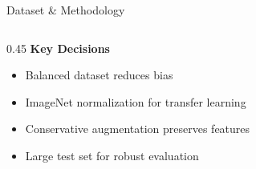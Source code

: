 \documentclass[aspectratio=169]{beamer}
\begin{document}
\begin{frame}{Dataset \& Methodology}
\begin{columns}[T]
\begin{column}{0.45\textwidth}
            \vspace{0.3cm}
            \textbf{Key Decisions}
            \begin{itemize}
                \item Balanced dataset reduces bias
                \item ImageNet normalization for transfer learning
                \item Conservative augmentation preserves features
                \item Large test set for robust evaluation
            \end{itemize}
        \end{column}
    \end{columns}
\end{frame}

\end{document}
